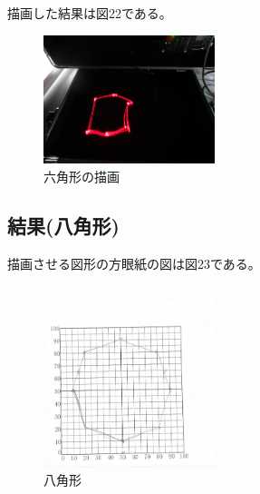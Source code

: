 \documentclass{jarticle}
\begin{document}
描画した結果は図22である。

\begin{figure}[H]
    \centering
    
    \includegraphics[width=5cm]{IMG_1756.JPG}
    \caption{六角形の描画}
    \label{fig:my_label}
\end{figure}

\subsection{結果(八角形)}

描画させる図形の方眼紙の図は図23である。
\begin{figure}[H]
    \centering
    
    \includegraphics[width=5cm]{8_8.pdf}
    \caption{八角形}
    \label{fig:my_label}
\end{figure}
\end{document}
